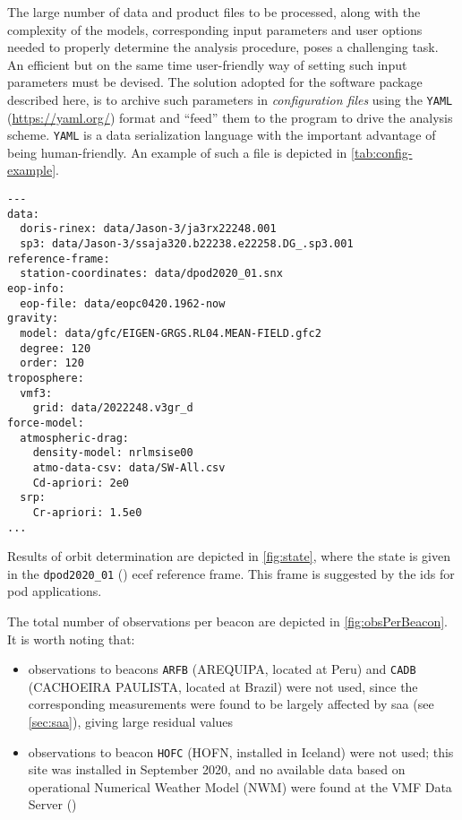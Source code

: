 The large number of data and product files to be processed, along with the complexity of 
the models, corresponding input parameters and user options needed to properly determine 
the analysis procedure, poses a challenging task. An efficient but on the same time 
user-friendly way of setting such input parameters must be devised. The solution adopted 
for the software package described here, is to archive such parameters in \emph{configuration files} 
using the \texttt{YAML} (\url{https://yaml.org/}) format and ``feed'' them to the 
program to drive the analysis scheme. \texttt{YAML} is a data serialization
language with the important advantage of being human-friendly. An example of such 
a file is depicted in \autoref{tab:config-example}.

\begin{center}
\begin{adjustbox}{center, max width=.7\linewidth , fbox=0.5pt, captionbelow={Configuration file example.}, float=table}
\begin{BVerbatim}
---
data:
  doris-rinex: data/Jason-3/ja3rx22248.001
  sp3: data/Jason-3/ssaja320.b22238.e22258.DG_.sp3.001
reference-frame:
  station-coordinates: data/dpod2020_01.snx
eop-info:
  eop-file: data/eopc0420.1962-now
gravity:
  model: data/gfc/EIGEN-GRGS.RL04.MEAN-FIELD.gfc2
  degree: 120
  order: 120
troposphere:
  vmf3:
    grid: data/2022248.v3gr_d
force-model:
  atmospheric-drag:
    density-model: nrlmsise00
    atmo-data-csv: data/SW-All.csv
    Cd-apriori: 2e0
  srp:
    Cr-apriori: 1.5e0
...
\end{BVerbatim}
\label{tab:config-example}
\end{adjustbox}
\end{center}

Results of orbit determination are depicted in \autoref{fig:state}, where the state 
is given in the \texttt{dpod2020\_01} (\cite{Moreaux2023}) \gls{ecef} reference 
frame. This frame is suggested by the \gls{ids} for \gls{pod} applications.

The total number of observations per beacon are depicted in \autoref{fig:obsPerBeacon}. 
It is worth noting that:
\begin{itemize}
  \item observations to beacons \texttt{ARFB} (AREQUIPA, located at Peru) and 
    \texttt{CADB} (CACHOEIRA PAULISTA, located at Brazil) were not used, 
    since the corresponding measurements were found to be largely affected by 
    \gls{saa} (see \autoref{sec:saa}), giving large residual values
  \item observations to beacon \texttt{HOFC} (HOFN, installed in Iceland) were not used; this site was installed in 
    September 2020, and no available data based on operational Numerical Weather Model (NWM) 
    were found at the VMF Data Server (\cite{vmf3DataServer})
\end{itemize}

